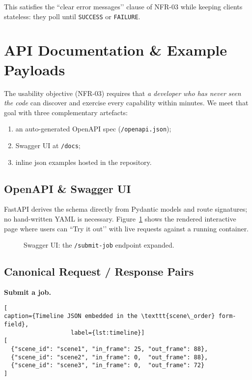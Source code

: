 This satisfies the “clear error messages’’ clause of NFR-03 while keeping
clients stateless: they poll until \texttt{SUCCESS} or \texttt{FAILURE}.

\section{API Documentation \& Example Payloads}
\label{sec:impl-docs}

The usability objective (NFR-03) requires that \emph{a developer who has never
seen the code} can discover and exercise every capability within minutes.  
We meet that goal with three complementary artefacts:

\begin{enumerate}
  \item an auto-generated OpenAPI spec (\texttt{/openapi.json});
  \item Swagger UI at \texttt{/docs};
  \item inline \gls{json} examples hosted in the repository.
\end{enumerate}

\subsection{OpenAPI \& Swagger UI}

FastAPI derives the schema directly from Pydantic models and route signatures; no
hand-written YAML is necessary.  Figure~\ref{fig:swagger} shows the rendered
interactive page where users can “Try it out’’ with live requests against a
running container.

\begin{figure}[htbp]
  \centering
  \fbox{\rule{0pt}{5cm}\rule{0.80\linewidth}{0pt}}
  \caption{Swagger UI: the \texttt{/submit-job} endpoint expanded.}
  \label{fig:swagger}
\end{figure}

\subsection{Canonical Request / Response Pairs}

\textbf{Submit a job.}

\begin{lstlisting}[
caption={Timeline JSON embedded in the \texttt{scene\_order} form-field},
                   label={lst:timeline}]
[
  {"scene_id": "scene1", "in_frame": 25, "out_frame": 88},
  {"scene_id": "scene2", "in_frame": 0,  "out_frame": 88},
  {"scene_id": "scene3", "in_frame": 0,  "out_frame": 72}
]
\end{lstlisting}

